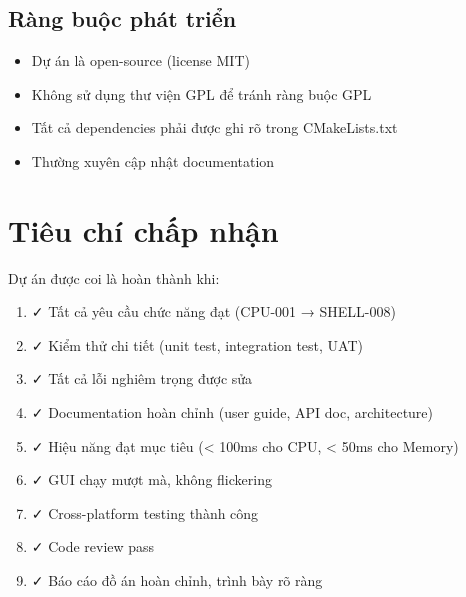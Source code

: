 \subsection{Ràng buộc phát triển}

\begin{itemize}[leftmargin=1.5cm]
  \item Dự án là open-source (license MIT)
  \item Không sử dụng thư viện GPL để tránh ràng buộc GPL
  \item Tất cả dependencies phải được ghi rõ trong CMakeLists.txt
  \item Thường xuyên cập nhật documentation
\end{itemize}

\section{Tiêu chí chấp nhận}

Dự án được coi là hoàn thành khi:

\begin{enumerate}[leftmargin=1.5cm]
  \item ✓ Tất cả yêu cầu chức năng đạt (CPU-001 → SHELL-008)
  \item ✓ Kiểm thử chi tiết (unit test, integration test, UAT)
  \item ✓ Tất cả lỗi nghiêm trọng được sửa
  \item ✓ Documentation hoàn chỉnh (user guide, API doc, architecture)
  \item ✓ Hiệu năng đạt mục tiêu (< 100ms cho CPU, < 50ms cho Memory)
  \item ✓ GUI chạy mượt mà, không flickering
  \item ✓ Cross-platform testing thành công
  \item ✓ Code review pass
  \item ✓ Báo cáo đồ án hoàn chỉnh, trình bày rõ ràng
\end{enumerate}

\clearpage

